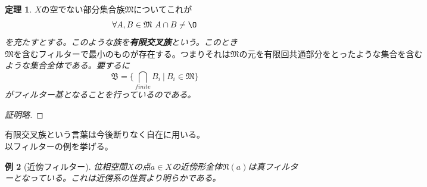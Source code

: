 \documentclass[leqno]{jsarticle}
\newtheorem{thm}{定理}
\newtheorem{exam}[thm]{例}
\begin{document}
\begin{thm}$Xの空でない部分集合族\mathfrak{M}についてこれが$
\[
\forall A,B\in \mathfrak{M}\ A\cap B\neq \O
\]を充たすとする。このような族を{\bf 有限交叉族}という。このとき$\mathfrak{M}を含むフィルターで最小のものが存在する。つまりそれは\mathfrak{M}の元を有限回共通部分をとったような集合を含む$ような集合全体である。要するに
\[
\mathfrak{B}=\{\bigcap_{finite}B_{i}\ |\ B_{i}\in \mathfrak{M}\}
\]がフィルター基となることを行っているのである。
\end{thm}
\begin{proof}[証明略]
\end{proof}
有限交叉族という言葉は今後断りなく自在に用いる。\\ 
以フィルターの例を挙げる。
\begin{exam}[近傍フィルター]位相空間$X$の点$a\in X$の近傍形全体$\mathfrak{N}(a)$は真フィルターとなっている。これは近傍系の性質より明らかである。
\end{exam}
\end{document}
